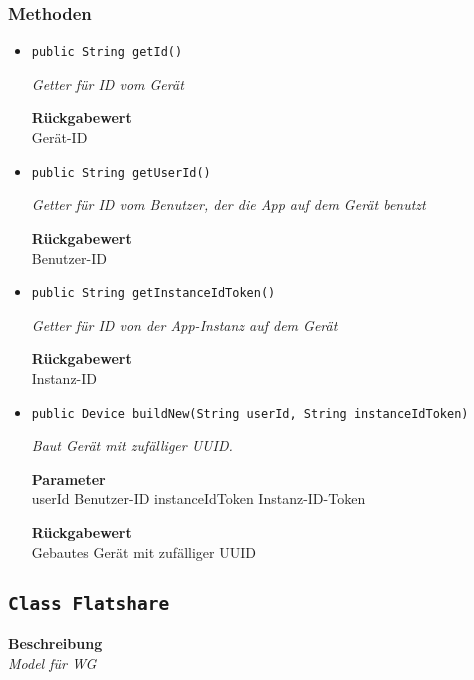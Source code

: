     \subsubsection*{Methoden}
    \begin{itemize}
    	\item{\texttt{public String getId()}}
    	
    	\textit{Getter für ID vom Gerät}
    	
    	
    	
    	\textbf{Rückgabewert} \\
    	Gerät-ID        \item{\texttt{public String getUserId()}}
    	
    	\textit{Getter für ID vom Benutzer, der die App auf dem Gerät benutzt}
    	
    	
    	
    	\textbf{Rückgabewert} \\
    	Benutzer-ID        \item{\texttt{public String getInstanceIdToken()}}
    	
    	\textit{Getter für ID von der App-Instanz auf dem Gerät}
    	
    	
    	
    	\textbf{Rückgabewert} \\
    	Instanz-ID        \item{\texttt{public Device buildNew(String userId, String instanceIdToken)}}
    	
    	\textit{Baut Gerät mit zufälliger UUID.}
    	
    	\textbf{Parameter} \\
    	userId Benutzer-ID
    	instanceIdToken Instanz-ID-Token
    	
    	\textbf{Rückgabewert} \\
    	Gebautes Gerät mit zufälliger UUID
    \end{itemize}
    \subsection{\texttt{Class Flatshare}}
    \textbf{Beschreibung} \\
    \textit{Model für WG}
